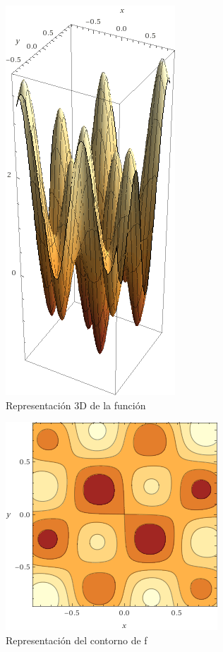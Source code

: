 \begin{figure}[H] %
	\centering
	\includegraphics[scale=0.6]{f.png}  %
	\caption{Representación 3D de la función} 
	\label{fig:f}
\end{figure}

\begin{figure}[H] %
	\centering
	\includegraphics[scale=0.6]{f2.png}  %
	\caption{Representación del contorno de f} 
	\label{fig:f22}
\end{figure}

